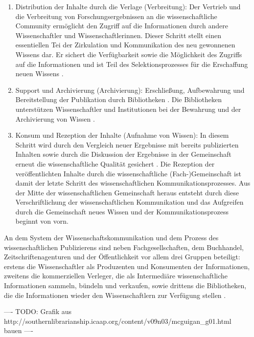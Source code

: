 \begin{enumerate}
\item Distribution der Inhalte durch die Verlage (Verbreitung): Der Vertrieb und die Verbreitung von Forschungsergebnissen an die wissenschaftliche Community ermöglicht den Zugriff auf die Informationen durch andere Wissenschaftler und Wissenschaftlerinnen. Dieser Schritt stellt einen essentiellen Tei der Zirkulation und Kommunikation des neu gewonnenen Wissens dar. Er sichert die Verfügbarkeit sowie die Möglichkeit des Zugriffs auf die Informationen und ist Teil des Selektionsprozesses für die Erschaffung neuen Wissens \cite{Nosek_2015}.
\item Support und Archivierung (Archivierung): Erschließung, Aufbewahrung und Bereitstellung der Publikation durch Bibliotheken \cite{Schirmbacher_2009}. Die Bibliotheken unterstützen Wissenschaftler und Institutionen bei der Bewahrung und der Archivierung von Wissen \cite{Koelbel_2002}.
\item Konsum und Rezeption der Inhalte (Aufnahme von Wissen): In diesem Schritt wird durch den Vergleich neuer Ergebnisse mit bereits publizierten Inhalten sowie durch die Diskussion der Ergebnisse in der Gemeinschaft erneut die wissenschaftliche Qualität gesichert \cite{Umstaetter_2007}. Die Rezeption der veröffentlichten Inhalte durch die wissenschaftliche (Fach-)Gemeinschaft ist damit der letzte Schritt des wissenschaftlichen Kommunikationsprozesses. Aus der Mitte der wissenschaftlichen Gemeinschaft heraus entsteht durch diese Verschriftlichung der wissenschaftlichen Kommunikation und das Aufgreifen durch die Gemeinschaft neues Wissen \cite{Schirmbacher_2009} und der Kommunikationsprozess beginnt von vorn.
\end{enumerate}

An dem System der Wissenschaftskommunikation und dem Prozess des wissenschaftlichen Publizierens sind neben Fachgesellschaften, dem Buchhandel, Zeitschriftenagenturen und der Öffentlichkeit \cite[:6]{Seidenfaden_2005} vor allem drei Gruppen beteiligt: erstens die Wissenschaftler als Produzenten und Konsumenten der Informationen, zweitens die kommerziellen Verleger, die als Intermediäre wissenschaftliche Informationen sammeln, bündeln und verkaufen, sowie drittens die Bibliotheken, die die Informationen wieder den Wissenschaftlern zur Verfügung stellen \cite{Odlyzko_1997}.

---- TODO: Grafik aus http://southernlibrarianship.icaap.org/content/v09n03/mcguigan_g01.html bauen ----


